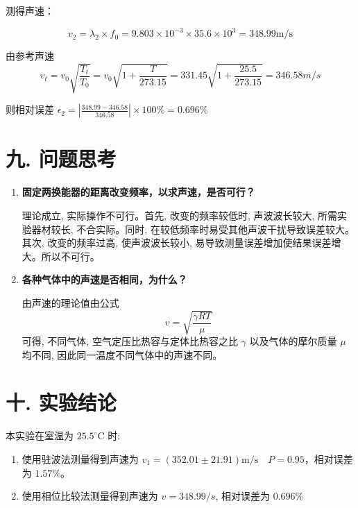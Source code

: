 \documentclass[12pt,a4paper]{article}
\begin{document}
	测得声速：

    $$v_{2}=\lambda_{2}\times f_{0}=9.803\times 10^{-3} \times 35.6\times 10^{3} = 348.99\mathrm{m/s}$$

    由参考声速 
	$$v_{t}=v_{0}\sqrt{\frac{T_{t}}{T_{0}}}=v_{0}\sqrt{1+\frac{T}{273.15}}=331.45\sqrt{1+\frac{25.5}{273.15}}=346.58m/s$$

    则相对误差 $\epsilon_{2}=\left|\frac{348.99-346.58}{346.58}\right|\times 100\%=0.696\%$


	\section*{\textbf{{九. 问题思考}}}

	\begin{enumerate}
		\item \textbf{固定两换能器的距离改变频率，以求声速，是否可行？}

		理论成立, 实际操作不可行。首先, 改变的频率较低时, 声波波长较大, 所需实验器材较长, 不合实际。同时, 在较低频率时易受其他声波干扰导致误差较大。其次, 改变的频率过高, 使声波波长较小, 易导致测量误差增加使结果误差增大。所以不可行。
		
		\item \textbf{各种气体中的声速是否相同，为什么？}
		
		由声速的理论值由公式
    $$v=\sqrt{\frac{\gamma RT}{\mu}}$$
    可得, 不同气体, 空气定压比热容与定体比热容之比 $\gamma$ 以及气体的摩尔质量 $\mu$ 均不同, 因此同一温度不同气体中的声速不同。
	\end{enumerate}

	
	\section*{\textbf{{十. 实验结论}}}
	
	本实验在室温为 $25.5^{\circ}$C 时:
\begin{enumerate}
    \item 使用驻波法测量得到声速为 $v_1 = (352.01\pm 21.91)\mathrm{m/s} \quad P = 0.95$，相对误差为 $1.57\% $。
    \item 使用相位比较法测量得到声速为 $v=348.99/s$, 相对误差为 $0.696\% $
\end{enumerate}
	
	
\end{document}
